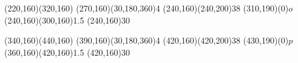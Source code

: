 \documentclass[a4paper]{article}
\begin{document}
\begin{center}
\begin{axopicture}
        \Line[arrow,arrowpos=0.5,arrowlength=6,arrowwidth=3,arrowinset=0.1](220,160)(320,160)
        \DashArc(270,160)(30,180,360){4}
        \Photon(240,160)(240,200){3}{8}
        \Text(310,190)(0){$o$}
        \DoubleLine[arrow,arrowpos=0.5,arrowlength=6,arrowwidth=3,arrowinset=0.1](240,160)(300,160){1.5}
        \GCirc(240,160){3}{0}

        \Line[arrow,arrowpos=0.5,arrowlength=6,arrowwidth=3,arrowinset=0.1](340,160)(440,160)
        \DashArc(390,160)(30,180,360){4}
        \Photon(420,160)(420,200){3}{8}
        \Text(430,190)(0){$p$}
        \DoubleLine[arrow,arrowpos=0.5,arrowlength=6,arrowwidth=3,arrowinset=0.1](360,160)(420,160){1.5}
        \GCirc(420,160){3}{0}

\end{axopicture}
\end{center}
\end{document}

